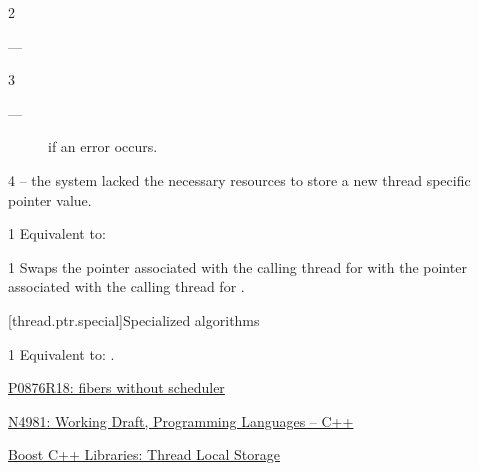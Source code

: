 \documentclass[fontsize=10pt,paper=A4,pagesize,DIV=15]{scrartcl}
\begin{document}
2 \postcond
\begin{description}
    \item[---] 
\end{description}

3 \except
\begin{description}
    \item[---]  if an error occurs.
\end{description}

4 \errors
{} -- the system lacked the necessary
resources to store a new thread specific pointer value.


1 \effects
Equivalent to: 


1 \effects
Swaps the pointer associated with the calling thread for \this with the
pointer associated with the calling thread for .

[thread.ptr.special]{Specialized algorithms}

1 \effects
Equivalent to: .

\cbend






\newpage
{}
\begin{thebibliography}{99}

        \href{https://www.open-std.org/jtc1/sc22/wg21/docs/papers/2024/p0876r18.pdf}
        {P0876R18: fibers without scheduler}

        \href{https://www.open-std.org/jtc1/sc22/wg21/docs/papers/2024/n4981.pdf}
        {N4981: Working Draft, Programming Languages -- C++}

        \href{https://www.boost.org/doc/libs/release/doc/html/thread/thread_local_storage.html}
        {Boost C++ Libraries: Thread Local Storage}

\end{thebibliography}

\end{document}
